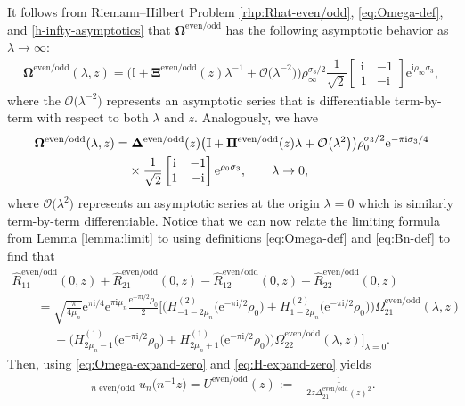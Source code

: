 \documentclass[pdftex]{sigma}
\numberwithin{equation}{section}
\newcommand{\ee}{\mathrm{e}}
\newcommand{\ii}{\mathrm{i}}
\begin{document}
It follows from Riemann--Hilbert Problem \ref{rhp:Rhat-even/odd}, \eqref{eq:Omega-def}, and \eqref{h-infty-asymptotics} that $\mathbf{\Omega}^\mathrm{even/odd}$ has the following asymptotic behavior as $\lambda \to \infty$:
\begin{align}
\mathbf{\Omega}^\mathrm{even/odd}(\lambda, z) = \big( \mathbb{I} + \mathbf{\Xi^{\mathrm{even/odd}}}(z) \lambda^{-1} + \mathcal{O}\big(\lambda^{-2}\big) \big) \rho_\infty^{\sigma_3/2} {\dfrac{1}{\sqrt{2}}} \begin{bmatrix} \ii & -1\\ 1 &-\ii \end{bmatrix} \ee^{\ii \rho_\infty \sigma_3},
 \label{eq:Omega-expand-infty}
\end{align}
where the $\mathcal{O}\big(\lambda^{-2}\big)$ represents an asymptotic series that is differentiable term-by-term with respect to both $\lambda$ and $z$. Analogously, we have
\begin{align}
 &\mathbf{\Omega}^{\mathrm{even/odd}}(\lambda,z)= \mathbf{\Delta}^\mathrm{even/odd}(z)\big(\mathbb{I}+\mathbf{\Pi}^\mathrm{even/odd}(z)\lambda+\mathcal{O}\big(\lambda^2\big)\big)\rho_0^{\sigma_3/2}\ee^{-\pi \ii \sigma_3/4} \nonumber\\
 &\hphantom{\mathbf{\Omega}^{\mathrm{even/odd}}(\lambda,z)=}{}
 \times{\dfrac{1}{\sqrt{2}}} {}{} \begin{bmatrix} \ii & -1 \\ 1 &-\ii \end{bmatrix} \ee^{ \rho_0 \sigma_3}, \qquad \lambda\to 0,
 \label{eq:Omega-expand-zero}
\end{align}
where $\mathcal{O}\big(\lambda^2\big)$ represents an asymptotic series at the origin $\lambda=0$ which is similarly term-by-term differentiable.
Notice that we can now relate the limiting formula from Lemma \ref{lemma:limit} to  using definitions \eqref{eq:Omega-def} and \eqref{eq:Bn-def} to find that
\begin{gather*}
 \hat{R}^\mathrm{even/odd}_{11}(0,z)+\hat{R}^\mathrm{even/odd}_{21}(0,z)-\hat{R}^\mathrm{even/odd}_{12}(0,z)-\hat{R}^\mathrm{even/odd}_{22}(0,z)\\
 \qquad =\sqrt{\frac{\pi}{4\mu_n}} \ee^{\pi \ii/4} \ee^{\pi \ii \mu_n} \frac{\ee^{-\pi \ii/2}\rho_0}{2} \big[ \big(H^{(2)}_{-1-2\mu_n}\big(\ee^{-\pi \ii/2}\rho_0\big) + H^{(2)}_{1-2\mu_n}\big(\ee^{-\pi \ii/2}\rho_0\big)\big)\Omega^{\mathrm{even/odd}}_{21}(\lambda, z) \\
 \phantom{\qquad =}{}- \big(H^{(1)}_{2\mu_n-1}\big(\ee^{-\pi \ii/2}\rho_0\big) + H^{(1)}_{2\mu_n +1}\big(\ee^{-\pi \ii/2}\rho_0\big)\big)\Omega^{\mathrm{even/odd}}_{22}(\lambda, z) \big]_{\lambda=0}.
\end{gather*}
Then, using \eqref{eq:Omega-expand-zero} and \eqref{eq:H-expand-zero} yields
\begin{gather*}
 \mathop{\lim_{n\to\infty}}_{\text{$n$ even/odd}}u_n\big(n^{-1}z\big)=U^\mathrm{even/odd}(z):=-\frac{1}{2z\Delta^\mathrm{even/odd}_{21}(z)^2}.
\end{gather*}
\end{document}
